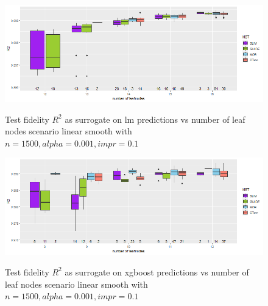 \begin{figure}[!htb]
\caption{Test fidelity $R^2$ as surrogate on lm predictions vs number of leaf nodes scenario linear smooth with $n=1500, alpha = 0.001, impr = 0.1$}
    \includegraphics[width=16cm]{Figures/simulations/batchtools/basic_scenarios/linear_smooth/ls_1000_lm_r2_test.png}
    \label{fig:app_ls_1000_lm_r2_test}
\end{figure} 

\begin{figure}[!htb]
\caption{Test fidelity $R^2$ as surrogate on xgboost predictions vs number of leaf nodes scenario linear smooth with $n=1500, alpha = 0.001, impr = 0.1$}
    \includegraphics[width=16cm]{Figures/simulations/batchtools/basic_scenarios/linear_smooth/ls_1000_xgboost_r2_test.png}
    \label{fig:app_ls_1000_xgboost_r2_test}
\end{figure} 



